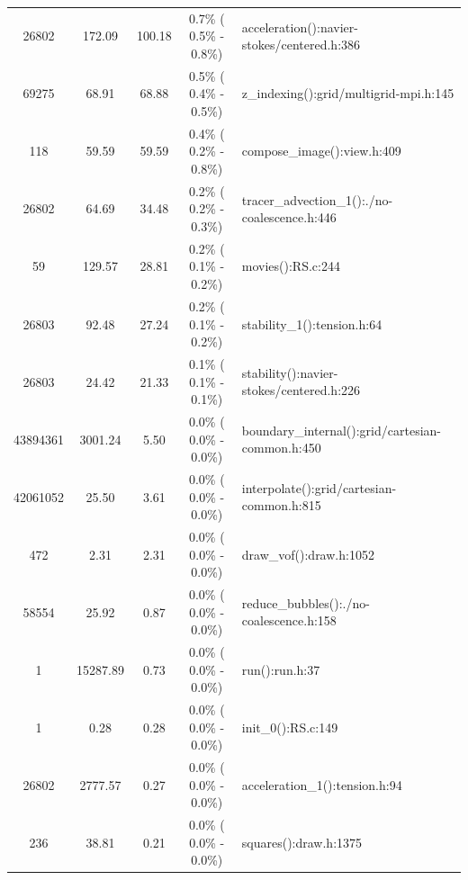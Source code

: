 \begin{table}
\begin{tabular}{c|c|c|c|l}
     26802 &  172.09  & 100.18    &  0.7\% ( 0.5\% -  0.8\%)   & acceleration():navier-stokes/centered.h:386\\
     69275 &   68.91  &  68.88    &  0.5\% ( 0.4\% -  0.5\%)   & z\_indexing():grid/multigrid-mpi.h:145\\
       118 &   59.59  &  59.59    &  0.4\% ( 0.2\% -  0.8\%)   & compose\_image():view.h:409\\
     26802 &   64.69  &  34.48    &  0.2\% ( 0.2\% -  0.3\%)   & tracer\_advection\_1():./no-coalescence.h:446\\
        59 &  129.57  &  28.81    &  0.2\% ( 0.1\% -  0.2\%)   & movies():RS.c:244\\
     26803 &   92.48  &  27.24    &  0.2\% ( 0.1\% -  0.2\%)   & stability\_1():tension.h:64\\
     26803 &   24.42  &  21.33    &  0.1\% ( 0.1\% -  0.1\%)   & stability():navier-stokes/centered.h:226\\
  43894361 &  3001.24 &    5.50   &   0.0\% ( 0.0\% -  0.0\%)  &  boundary\_internal():grid/cartesian-common.h:450\\
  42061052 &   25.50  &   3.61    &  0.0\% ( 0.0\% -  0.0\%)   & interpolate():grid/cartesian-common.h:815\\
       472 &    2.31  &   2.31    &  0.0\% ( 0.0\% -  0.0\%)   & draw\_vof():draw.h:1052\\
     58554 &   25.92  &   0.87    &  0.0\% ( 0.0\% -  0.0\%)   & reduce\_bubbles():./no-coalescence.h:158\\
         1 &  15287.89&     0.73  &    0.0\% ( 0.0\% -  0.0\%) &   run():run.h:37\\
         1 &    0.28  &   0.28    &  0.0\% ( 0.0\% -  0.0\%)   & init\_0():RS.c:149\\
     26802 &  2777.57 &    0.27   &   0.0\% ( 0.0\% -  0.0\%)  &  acceleration\_1():tension.h:94\\
       236 &   38.81  &   0.21    &  0.0\% ( 0.0\% -  0.0\%)   & squares():draw.h:1375\\

\end{tabular}
\end{table}
